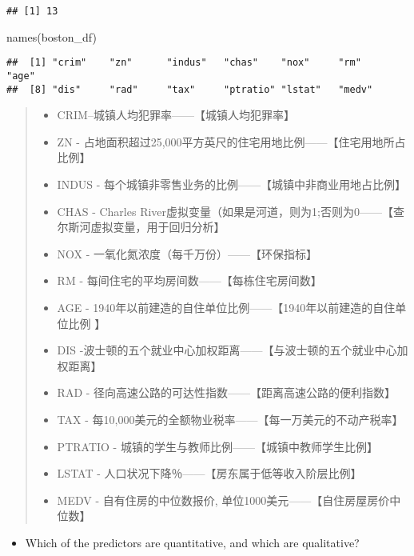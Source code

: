 \documentclass[
]{article}
\newenvironment{Shaded}{\begin{snugshade}}{\end{snugshade}}
\newcommand{\FunctionTok}[1]{\textcolor[rgb]{0.00,0.00,0.00}{#1}}
\newcommand{\NormalTok}[1]{#1}
\providecommand{\tightlist}{%
  \setlength{\itemsep}{0pt}\setlength{\parskip}{0pt}}
\begin{document}
\begin{verbatim}
## [1] 13
\end{verbatim}

\begin{Shaded}
\begin{Highlighting}[]
\FunctionTok{names}\NormalTok{(boston\_df)}
\end{Highlighting}
\end{Shaded}

\begin{verbatim}
##  [1] "crim"    "zn"      "indus"   "chas"    "nox"     "rm"      "age"    
##  [8] "dis"     "rad"     "tax"     "ptratio" "lstat"   "medv"
\end{verbatim}

\begin{quote}
\begin{itemize}
\tightlist
\item
  CRIM--城镇人均犯罪率------【城镇人均犯罪率】
\item
  ZN -
  占地面积超过25,000平方英尺的住宅用地比例------【住宅用地所占比例】
\item
  INDUS - 每个城镇非零售业务的比例------【城镇中非商业用地占比例】
\item
  CHAS - Charles
  River虚拟变量（如果是河道，则为1;否则为0------【查尔斯河虚拟变量，用于回归分析】
\item
  NOX - 一氧化氮浓度（每千万份）------【环保指标】
\item
  RM - 每间住宅的平均房间数------【每栋住宅房间数】
\item
  AGE - 1940年以前建造的自住单位比例------【1940年以前建造的自住单位比例
  】
\item
  DIS
  -波士顿的五个就业中心加权距离------【与波士顿的五个就业中心加权距离】
\item
  RAD - 径向高速公路的可达性指数------【距离高速公路的便利指数】
\item
  TAX - 每10,000美元的全额物业税率------【每一万美元的不动产税率】
\item
  PTRATIO - 城镇的学生与教师比例------【城镇中教师学生比例】
\item
  LSTAT - 人口状况下降％------【房东属于低等收入阶层比例】
\item
  MEDV - 自有住房的中位数报价, 单位1000美元------【自住房屋房价中位数】
\end{itemize}
\end{quote}

\begin{itemize}
\tightlist
\item
  Which of the predictors are quantitative, and which are qualitative?
\end{itemize}
\end{document}
